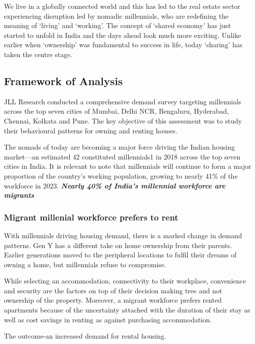 We live in a globally connected world and this has led to the real estate sector
experiencing disruption led by nomadic millennials, who are redefining the meaning
of ‘living’ and ‘working’. The concept of ‘shared economy’ has just started to
unfold in India and the days ahead look much more exciting. Unlike earlier when ‘ownership’
was fundamental to success in life, today ‘sharing’ has taken the centre stage.\par

\subsection{Framework of Analysis}
JLL Research conducted a comprehensive demand survey targeting millennials across
the top seven cities of Mumbai, Delhi NCR, Bengaluru, Hyderabad, Chennai, Kolkata
and Pune. The key objective of this assessment was to study their behavioural patterns
for owning and renting houses.\par\medskip

The nomads of today are becoming a major force driving the Indian housing market—an estimated 42%
constituted millennials1 in 2018 across the top seven cities in India. It is relevant to note that millennials will continue to form a major
proportion of the country’s working population, growing to nearly 41\% of the workforce in 2023.
\textbf{\textit{Nearly 40\% of India’s millennial workforce are migrants}}\par

\subsubsection{Migrant millenial workforce prefers to rent}
With millennials driving housing demand, there is a marked change in demand patterns. Gen Y has a different take on home
ownership from their parents. Earlier generations moved to the peripheral locations to fulfil their dreams of owning a home, but
millennials refuse to compromise.\par\medskip
While selecting an accommodation, connectivity to their workplace, convenience and security are the factors on top of their
decision making tree and not ownership of the property. Moreover, a migrant workforce prefers rented apartments because of the
uncertainty attached with the duration of their stay as well as cost savings in renting as against purchasing accommodation.\par\medskip
The outcome-an increased demand for rental housing.

